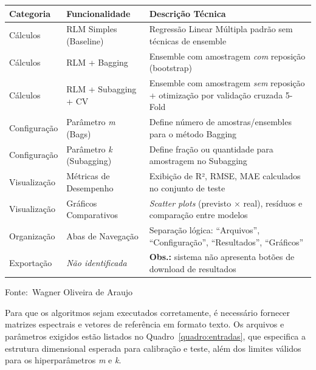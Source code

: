 \documentclass[12pt,a4paper]{article}
\newcommand{\oautor}{Wagner Oliveira de Araujo}
\begin{document}
\begin{quadro}[ht]
\centering
\small
\caption{Inventário das funções do sistema}
\label{quadro:funcoes}
\begin{threeparttable}
\begin{tabularx}{\textwidth}{|l|l|X|} \hline
\textbf{Categoria} & \textbf{Funcionalidade} & \textbf{Descrição Técnica} \\ \hline
Cálculos & RLM Simples (Baseline) & Regressão Linear Múltipla padrão sem técnicas de ensemble \\ \hline
Cálculos & RLM + Bagging & Ensemble com amostragem \textit{com} reposição (bootstrap) \\ \hline
Cálculos & RLM + Subagging + CV & Ensemble com amostragem \textit{sem} reposição + otimização por validação cruzada 5-Fold \\ \hline
Configuração & Parâmetro \textit{m} (Bags) & Define número de amostras/ensembles para o método Bagging \\ \hline
Configuração & Parâmetro \textit{k} (Subagging) & Define fração ou quantidade para amostragem no Subagging \\ \hline
Visualização & Métricas de Desempenho & Exibição de R², RMSE, MAE calculados no conjunto de teste \\ \hline
Visualização & Gráficos Comparativos & \textit{Scatter plots} (previsto $\times$ real), resíduos e comparação entre modelos \\ \hline
Organização & Abas de Navegação & Separação lógica: ``Arquivos'', ``Configuração'', ``Resultados'', ``Gráficos'' \\ \hline
Exportação & \textit{Não identificada} & \textbf{Obs.:} sistema não apresenta botões de download de resultados \\ \hline
\end{tabularx}
\begin{tablenotes}[flushleft]
\footnotesize
\item Fonte:~\oautor
\end{tablenotes}
\end{threeparttable}
\end{quadro}

Para que os algoritmos sejam executados corretamente, é necessário fornecer matrizes espectrais e vetores de referência em formato texto. Os arquivos e parâmetros exigidos estão listados no Quadro~\ref{quadro:entradas}, que especifica a estrutura dimensional esperada para calibração e teste, além dos limites válidos para os hiperparâmetros \textit{m} e \textit{k}.
\end{document}
